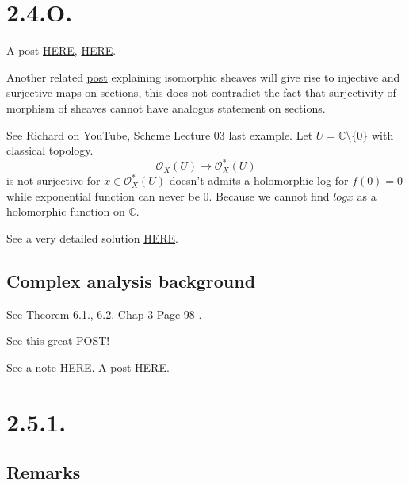 \section{2.4.O.}

A post \href{https://math.stackexchange.com/questions/58306/examples-of-surjective-sheaf-morphisms-which-are-not-surjective-on-sections}{HERE}, \href{https://math.stackexchange.com/questions/232049/surjectivity-of-morphisms-of-sheaves-on-a-base}{HERE}.

Another related \href{https://math.stackexchange.com/questions/3939622/example-of-isomorphic-sheaves-whose-sections-arent-isomorphic}{post} explaining isomorphic sheaves will give rise to injective and surjective maps on sections, this does not contradict the fact that surjectivity of morphism of sheaves cannot have analogus statement on sections.

See Richard on YouTube, Scheme Lecture 03 last example. Let $U=\mathbb C\setminus \{0\}$ with classical topology. 
\[\mathscr O_X(U)\to\mathscr O_X^{\ast}(U)\] is not surjective for $x\in\mathscr O_X^{\ast}(U)$ doesn't admits a holomorphic log for $f(0)=0$ while exponential function can never be $0$. Because we cannot find $log x$ as a holomorphic function on $\mathbb C$.

See a very detailed solution \href{https://www2.math.ethz.ch/education/bachelor/lectures/fs2016/math/alg_geom/Solution12.pdf}{HERE}.

\subsection{Complex analysis background}

See Theorem 6.1., 6.2. Chap 3 Page 98 \cite{stein2010complex}. 

See this great \href{https://math.stackexchange.com/questions/3783476/show-that-there-does-not-exist-a-holomorphic-function-hz-such-that-exphz}{POST}!

See a note \href{https://math.berkeley.edu/~vvdatar/m185f16/notes/Lecture-15_Logarithm.pdf}{HERE}. 
A post \href{https://math.stackexchange.com/questions/1803352/why-cant-we-define-a-branch-of-log-fz-in-the-whole-complex-plane}{HERE}.

\section{2.5.1.}

\subsection{Remarks}

